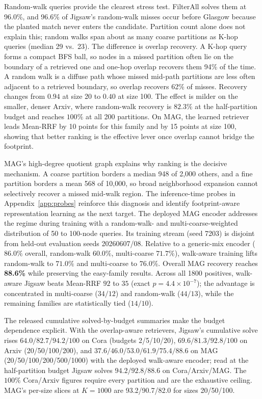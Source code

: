 \documentclass{article}
\begin{document}
Random-walk queries provide the clearest stress test. FilterAll solves them at 96.0\%, and 96.6\% of Jigsaw's random-walk misses occur before Glasgow because the planted match never enters the candidate. Partition count alone does not explain this; random walks span about as many coarse partitions as K-hop queries (median 29 vs.\ 23). The difference is overlap recovery. A K-hop query forms a compact BFS ball, so nodes in a missed partition often lie on the boundary of a retrieved one and one-hop overlap recovers them 94\% of the time. A random walk is a diffuse path whose missed mid-path partitions are less often adjacent to a retrieved boundary, so overlap recovers 62\% of misses. Recovery changes from $0.94$ at size 20 to $0.40$ at size 100. The effect is milder on the smaller, denser Arxiv, where random-walk recovery is $82.3\%$ at the half-partition budget and reaches $100\%$ at all 200 partitions. On MAG, the learned retriever leads Mean-RRF by 10 points for this family and by 15 points at size 100, showing that better ranking is the effective lever once overlap cannot bridge the footprint.

MAG's high-degree quotient graph explains why ranking is the decisive mechanism. A coarse partition borders a median 948 of 2{,}000 others, and a fine partition borders a mean 568 of 10{,}000, so broad neighborhood expansion cannot selectively recover a missed mid-walk region. The inference-time probes in Appendix~\ref{app:probes} reinforce this diagnosis and identify footprint-aware representation learning as the next target. The deployed MAG encoder addresses the regime during training with a random-walk- and multi-coarse-weighted distribution of 50 to 100-node queries. Its training stream (seed 7203) is disjoint from held-out evaluation seeds 20260607/08. Relative to a generic-mix encoder ($86.0\%$ overall, random-walk $60.0\%$, multi-coarse $71.7\%$), walk-aware training lifts random-walk to $71.0\%$ and multi-coarse to $76.0\%$. Overall MAG recovery reaches \textbf{88.6\%} while preserving the easy-family results. Across all 1800 positives, walk-aware Jigsaw beats Mean-RRF $92$ to $35$ (exact $p{=}4.4{\times}10^{-7}$); the advantage is concentrated in multi-coarse ($34/12$) and random-walk ($44/13$), while the remaining families are statistically tied ($14/10$).

The released cumulative solved-by-budget summaries make the budget dependence explicit. With the overlap-aware retrievers, Jigsaw's cumulative solve rises $64.0/82.7/94.2/100$ on Cora (budgets 2/5/10/20), $69.6/81.3/92.8/100$ on Arxiv (20/50/100/200), and $37.6/46.0/53.0/61.9/75.4/88.6$ on MAG (20/50/100/200/500/1000) with the deployed walk-aware encoder; read at the half-partition budget Jigsaw solves $94.2/92.8/88.6$ on Cora/Arxiv/MAG. The $100\%$ Cora/Arxiv figures require every partition and are the exhaustive ceiling. MAG's per-size slices at $K{=}1000$ are 93.2/90.7/82.0 for sizes 20/50/100.
\end{document}
